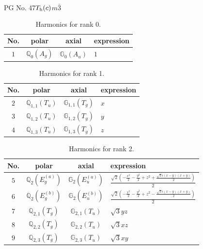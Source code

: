 \documentclass[fleqn,8pt,landscape]{jsarticle}
\begin{document}
\setcounter{MaxMatrixCols}{32}

\renewcommand{\tablename}{Table~}
\renewcommand{\figurename}{Figure~}
\begin{center}
\LARGE
PG No. 47\quad$T_{\rm h}(c)$\quad$m\bar{3}$\quad[ cubic ]
\end{center}
\begin{table}[ht!]
\begin{center}
\caption{Harmonics for rank 0.}
\renewcommand{\arraystretch}{1.3}
\begin{tabular}{cccl} \hline \hline
No. & polar & axial & expression \\ \hline
$ 1 $ & $ \mathbb{Q}_{0}(A_{g}) $ & $ \mathbb{G}_{0}(A_{u}) $ & $ 1 $ \\
 \hline \hline
\end{tabular}
\end{center}
\end{table}
\begin{table}[ht!]
\begin{center}
\caption{Harmonics for rank 1.}
\renewcommand{\arraystretch}{1.3}
\begin{tabular}{cccl} \hline \hline
No. & polar & axial & expression \\ \hline
$ 2 $ & $ \mathbb{Q}_{1,1}(T_{u}) $ & $ \mathbb{G}_{1,1}(T_{g}) $ & $ x $ \\
$ 3 $ & $ \mathbb{Q}_{1,2}(T_{u}) $ & $ \mathbb{G}_{1,2}(T_{g}) $ & $ y $ \\
$ 4 $ & $ \mathbb{Q}_{1,3}(T_{u}) $ & $ \mathbb{G}_{1,3}(T_{g}) $ & $ z $ \\
 \hline \hline
\end{tabular}
\end{center}
\end{table}
\begin{table}[ht!]
\begin{center}
\caption{Harmonics for rank 2.}
\renewcommand{\arraystretch}{1.3}
\begin{tabular}{cccl} \hline \hline
No. & polar & axial & expression \\ \hline
$ 5 $ & $ \mathbb{Q}_{2}(E_{g}^{(a)}) $ & $ \mathbb{G}_{2}(E_{u}^{(a)}) $ & $ \frac{\sqrt{2} \left(- \frac{x^{2}}{2} - \frac{y^{2}}{2} + z^{2} + \frac{\sqrt{3} i \left(x - y\right) \left(x + y\right)}{2}\right)}{2} $ \\
$ 6 $ & $ \mathbb{Q}_{2}(E_{g}^{(b)}) $ & $ \mathbb{G}_{2}(E_{u}^{(b)}) $ & $ \frac{\sqrt{2} \left(- \frac{x^{2}}{2} - \frac{y^{2}}{2} + z^{2} - \frac{\sqrt{3} i \left(x - y\right) \left(x + y\right)}{2}\right)}{2} $ \\
$ 7 $ & $ \mathbb{Q}_{2,1}(T_{g}) $ & $ \mathbb{G}_{2,1}(T_{u}) $ & $ \sqrt{3} y z $ \\
$ 8 $ & $ \mathbb{Q}_{2,2}(T_{g}) $ & $ \mathbb{G}_{2,2}(T_{u}) $ & $ \sqrt{3} x z $ \\
$ 9 $ & $ \mathbb{Q}_{2,3}(T_{g}) $ & $ \mathbb{G}_{2,3}(T_{u}) $ & $ \sqrt{3} x y $ \\
 \hline \hline
\end{tabular}
\end{center}
\end{table}
\end{document}
